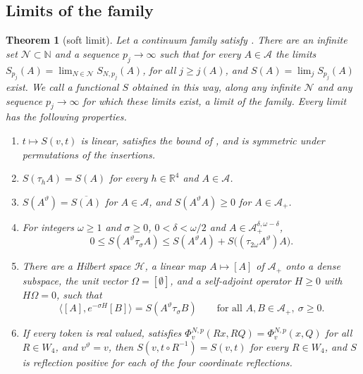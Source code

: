 \documentclass[11pt,a4paper]{amsart}
\newtheorem{theorem}{Theorem}[section]
\theoremstyle{definition}
\theoremstyle{remark}
\numberwithin{equation}{section}
\newcommand{\R}{\mathbb{R}}          %
\newcommand{\Nat}{\mathbb{N}}        %
\newcommand{\Hilb}{\mathcal{H}}      %
\newcommand{\ip}[2]{\langle #1,#2\rangle}  %
\newcommand{\UVB}{\text{\upshape(UVB)}}             %
\begin{document}
\subsection{Limits of the family}

\begin{theorem}[soft limit]\label{thm:soft-limit}
Let a continuum family satisfy \UVB. There are an infinite set $\mathcal N\subset\Nat$ and a sequence $p_j\to\infty$ such that for every $A\in\mathcal A$ the limits $S_{p_j}(A)=\lim_{N\in\mathcal N}S_{N,p_j}(A)$, for all $j\ge j(A)$, and $S(A)=\lim_jS_{p_j}(A)$ exist. We call a functional $S$ obtained in this way, along any infinite $\mathcal N$ and any sequence $p_j\to\infty$ for which these limits exist, a \emph{limit} of the family. Every limit has the following properties.
\begin{enumerate}[label=(\alph*),leftmargin=2.2em]
\item $t\mapsto S(v,t)$ is linear, satisfies the bound of \UVB, and is symmetric under permutations of the insertions.
\item $S(\tau_hA)=S(A)$ for every $h\in\R^4$ and $A\in\mathcal A$.
\item $S(A^\vartheta)=\overline{S(A)}$ for $A\in\mathcal A$, and $S(A^\vartheta A)\ge0$ for $A\in\mathcal A_+$.
\item For integers $\omega\ge1$ and $\sigma\ge0$, $0<\delta<\omega/2$ and $A\in\mathcal A_+^{\delta,\omega-\delta}$,
\[
0\le S(A^\vartheta\tau_\sigma A)\le S(A^\vartheta A)+S\bigl((\tau_{2\omega}A^\vartheta)A\bigr).
\]
\item There are a Hilbert space $\Hilb$, a linear map $A\mapsto[A]$ of $\mathcal A_+$ onto a dense subspace, the unit vector $\Omega=[\emptyset]$, and a self-adjoint operator $H\ge0$ with $H\Omega=0$, such that
\[
\ip{[A]}{e^{-\sigma H}[B]}=S(A^\vartheta\tau_\sigma B)\qquad\text{for all }A,B\in\mathcal A_+,\ \sigma\ge0 .
\]
\item If every token is real valued, satisfies $\Phi^{N,p}_v(Rx,RQ)=\Phi^{N,p}_v(x,Q)$ for all $R\in W_4$, and $v^\vartheta=v$, then $S(v,t\circ R^{-1})=S(v,t)$ for every $R\in W_4$, and $S$ is reflection positive for each of the four coordinate reflections.
\end{enumerate}
\end{theorem}
\end{document}
